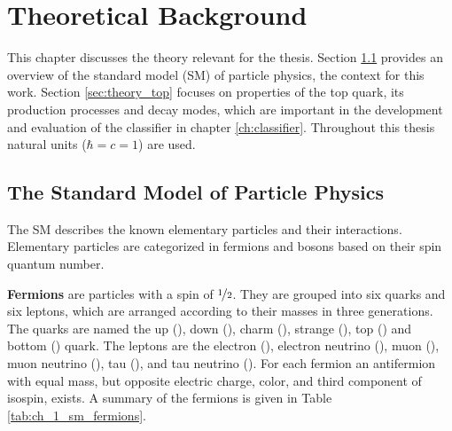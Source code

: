 \chapter{Theoretical Background}
\label{ch:theory}

This chapter discusses the theory relevant for the thesis. Section \ref{sec:theory_sm} provides an overview of the standard model (SM) of particle physics, the context for this work. Section \ref{sec:theory_top} focuses on properties of the top quark, its production processes and decay modes, which are important in the development and evaluation of the classifier in chapter \ref{ch:classifier}. Throughout this thesis natural units ($\hbar=c=1$) are used.

\section{The Standard Model of Particle Physics}
\label{sec:theory_sm}
The SM describes the known elementary particles and their interactions. Elementary particles are categorized in fermions and bosons based on their spin quantum number.

\textbf{Fermions} are particles with a spin of $\nicefrac{1}{2}$. They are grouped into six quarks and six leptons, which are arranged according to their masses in three generations. The quarks are named the up (\Pup), down (\Pdown), charm (\Pcharm), strange (\Pstrange), top (\Ptop) and bottom (\Pbottom) quark. The leptons are the electron (\Pe), electron neutrino (\Pelectronneutrino), muon (\Pmuon), muon neutrino (\Pmuonneutrino), tau (\Ptau), and tau neutrino (\Ptauneutrino). For each fermion an antifermion with equal mass, but opposite electric charge, color, and third component of isospin, exists. A summary of the fermions is given in Table \ref{tab:ch_1_sm_fermions}.

